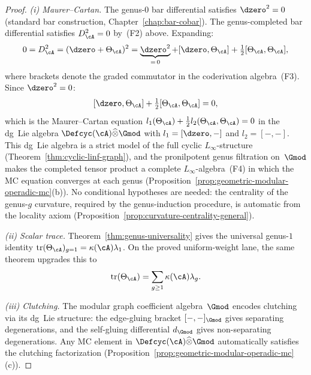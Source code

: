 \begin{proof}
\medskip\noindent
\emph{(i) Maurer--Cartan.}
The genus-$0$ bar differential satisfies $\dzero^2 = 0$
(standard bar construction, Chapter~\ref{chap:bar-cobar}).
The genus-completed bar
differential satisfies $D_\cA^2 = 0$ by~(F2) above.
Expanding:
\[
0 = D_\cA^2
= (\dzero + \Theta_\cA)^2
= \underbrace{\dzero^2}_{=\,0}
+ [\dzero, \Theta_\cA]
+ \tfrac{1}{2}[\Theta_\cA, \Theta_\cA],
\]
where brackets denote the graded commutator in the coderivation
algebra~(F3).  Since $\dzero^2 = 0$:
\[
[\dzero, \Theta_\cA]
+ \tfrac{1}{2}[\Theta_\cA, \Theta_\cA]
= 0,
\]
which is the Maurer--Cartan equation
$l_1(\Theta_\cA) + \tfrac12 l_2(\Theta_\cA, \Theta_\cA) = 0$
in the dg~Lie algebra $\Defcyc(\cA) \widehat{\otimes} \Gmod$
with $l_1 = [\dzero,-]$ and $l_2 = [-,-]$.
This dg~Lie algebra is a strict model of the full cyclic
$L_\infty$-structure
(Theorem~\ref{thm:cyclic-linf-graph}), and the pronilpotent
genus filtration on~$\Gmod$ makes the completed tensor product
a complete $L_\infty$-algebra~(F4) in which the MC equation
converges at each genus
(Proposition~\ref{prop:geometric-modular-operadic-mc}(b)).
No conditional hypotheses are needed: the centrality of the
genus-$g$ curvature, required by the genus-induction procedure,
is automatic from the locality axiom
(Proposition~\ref{prop:curvature-centrality-general}).

\emph{(ii) Scalar trace.}
Theorem~\ref{thm:genus-universality} gives the universal genus-$1$
identity
$\operatorname{tr}(\Theta_\cA)_{g=1} = \kappa(\cA)\lambda_1$.
On the proved uniform-weight lane, the same theorem upgrades this to
\[
  \operatorname{tr}(\Theta_\cA)
  = \sum_{g \geq 1} \kappa(\cA)\lambda_g .
\]

\emph{(iii) Clutching.}
The modular graph coefficient algebra~$\Gmod$ encodes
clutching via its dg~Lie structure: the edge-gluing bracket
$[-,-]_{\Gmod}$ gives separating degenerations, and the
self-gluing differential $d_{\Gmod}$ gives non-separating
degenerations.  Any MC element in
$\Defcyc(\cA) \widehat{\otimes} \Gmod$ automatically
satisfies the clutching factorization
(Proposition~\ref{prop:geometric-modular-operadic-mc}(c)).


\end{proof}
